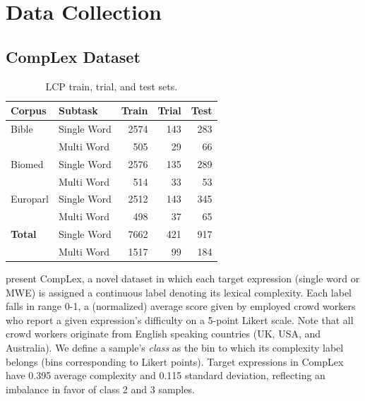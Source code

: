 \documentclass{dcthesis}
\theoremstyle{definition}
\theoremstyle{remark}
\begin{document}
\chapter{Data Collection}

\section{CompLex Dataset}

\begin{table}
  \centering
  \begin{tabular}{l|l|r|r|r}
    \toprule
    \centering
    \textbf{Corpus} & \textbf{Subtask} & \textbf{Train} &  \textbf{Trial} &  \textbf{Test} \\
    \midrule
    Bible & Single Word &   2574 &    143 &   283 \\
            & Multi Word &    505 &     29 &    66 \\
    Biomed & Single Word &   2576 &    135 &   289 \\
            & Multi Word &    514 &     33 &    53 \\
    Europarl & Single Word &   2512 &    143 &   345 \\
            & Multi Word &    498 &     37 &    65 \\
    \midrule
    \textbf{Total} & Single Word & 7662 & 421 & 917 \\
          & Multi Word &    1517 &     99 &    184 \\
    \bottomrule
  \end{tabular}
  \caption{\label{tab:datasets} LCP train, trial, and test sets.}
\end{table}

\citet{shardlow2020complex} present CompLex, a novel dataset in which each target expression (single word or MWE) is assigned a continuous label denoting its lexical complexity. Each label falls in range 0-1, a (normalized) average score given by employed crowd workers who report a given expression's difficulty on a 5-point Likert scale. Note that all crowd workers originate from English speaking countries (UK, USA, and Australia). We define a sample's \textit{class} as the bin to which its complexity label belongs (bins corresponding to Likert points). Target expressions in CompLex have 0.395 average complexity and 0.115 standard deviation, reflecting an imbalance in favor of class 2 and 3 samples.
\end{document}
